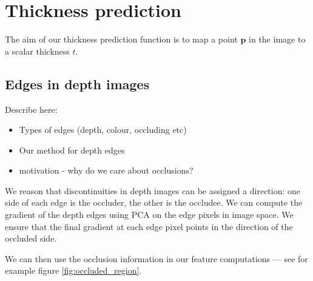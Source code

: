 \documentclass[10pt,twocolumn,letterpaper]{article}
\newcommand{\point}{\mathbf{p}}
\begin{document}
\section{Thickness prediction}

The aim of our thickness prediction function is to map a point $\point$ in the image to a scalar thickness $t$.


\subsection{Edges in depth images}
Describe here:
\begin{itemize}
\item Types of edges (depth, colour, occluding etc)
\item Our method for depth edges
\item motivation - why do we care about occlusions?
\end{itemize}

We reason that discontinuities in depth images can be assigned a direction: one side of each edge is the occluder, the other is the occludee. 
We can compute the gradient of the depth edges using PCA on the edge pixels in image space.
We ensure that the final gradient at each edge pixel points in the direction of the occluded side.

We can then use the occlusion information in our feature computations --- see for example figure \ref{fig:occluded_region}.
\end{document}
